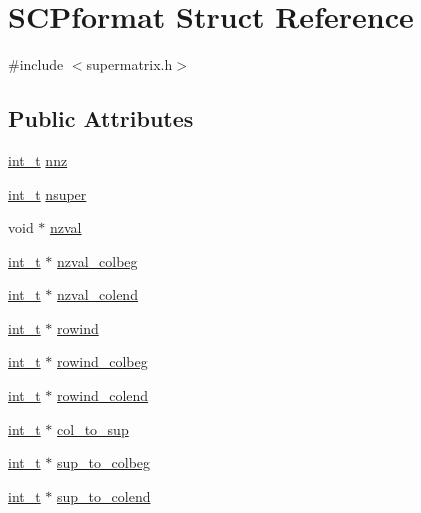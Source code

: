 \hypertarget{structSCPformat}{}\section{S\+C\+Pformat Struct Reference}
\label{structSCPformat}


{\ttfamily \#include $<$supermatrix.\+h$>$}

\subsection*{Public Attributes}
\begin{DoxyCompactItemize}
\item 
\hyperlink{slu__cdefs_8h_ab6fd6105e64ed14a0c9281326f05e623}{int\+\_\+t} \hyperlink{structSCPformat_ad4b6e7424269c3cbe9a368604433870e}{nnz}
\item 
\hyperlink{slu__cdefs_8h_ab6fd6105e64ed14a0c9281326f05e623}{int\+\_\+t} \hyperlink{structSCPformat_a20ee99d8cfb0cecad94373e2eb5abef8}{nsuper}
\item 
void $\ast$ \hyperlink{structSCPformat_a028e5f9ef15054302c1403969c37a0fb}{nzval}
\item 
\hyperlink{slu__cdefs_8h_ab6fd6105e64ed14a0c9281326f05e623}{int\+\_\+t} $\ast$ \hyperlink{structSCPformat_aa9bae5f483aa1a22aec18f5c2393f05e}{nzval\+\_\+colbeg}
\item 
\hyperlink{slu__cdefs_8h_ab6fd6105e64ed14a0c9281326f05e623}{int\+\_\+t} $\ast$ \hyperlink{structSCPformat_a098e9a5c87e2c0b35c82852b1910334d}{nzval\+\_\+colend}
\item 
\hyperlink{slu__cdefs_8h_ab6fd6105e64ed14a0c9281326f05e623}{int\+\_\+t} $\ast$ \hyperlink{structSCPformat_a5b4ccbb31fa3a7c2372b5a297453e200}{rowind}
\item 
\hyperlink{slu__cdefs_8h_ab6fd6105e64ed14a0c9281326f05e623}{int\+\_\+t} $\ast$ \hyperlink{structSCPformat_a1bd16ec6ab44636e56da09d65fbe8402}{rowind\+\_\+colbeg}
\item 
\hyperlink{slu__cdefs_8h_ab6fd6105e64ed14a0c9281326f05e623}{int\+\_\+t} $\ast$ \hyperlink{structSCPformat_a09c1770c0baad3c1152d48587ad084b4}{rowind\+\_\+colend}
\item 
\hyperlink{slu__cdefs_8h_ab6fd6105e64ed14a0c9281326f05e623}{int\+\_\+t} $\ast$ \hyperlink{structSCPformat_aba16553c2896f7c88450621f18b54bae}{col\+\_\+to\+\_\+sup}
\item 
\hyperlink{slu__cdefs_8h_ab6fd6105e64ed14a0c9281326f05e623}{int\+\_\+t} $\ast$ \hyperlink{structSCPformat_a345ad774183c979674dd0960a930508e}{sup\+\_\+to\+\_\+colbeg}
\item 
\hyperlink{slu__cdefs_8h_ab6fd6105e64ed14a0c9281326f05e623}{int\+\_\+t} $\ast$ \hyperlink{structSCPformat_a8e470d085ca7b39645336943a1f2eae6}{sup\+\_\+to\+\_\+colend}
\end{DoxyCompactItemize}


